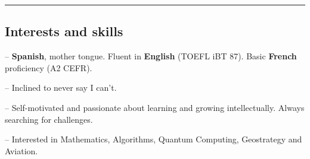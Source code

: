 \documentclass[10pt,letterpaper]{article}
\newenvironment{indentsection}[1]%
{\begin{list}{}%
	{\setlength{\leftmargin}{#1}}%
	\item[]%
}
{\end{list}}
\begin{document}
\hrule
\vspace{-0.4em}
\subsection*{Interests and skills}

\begin{indentsection}{\parindent}
\begin{description*}
	\item -- \textbf{Spanish}, mother tongue. Fluent in \textbf{English} (TOEFL iBT 87). Basic \textbf{French} proficiency (A2 CEFR).
	\item -- Inclined to never say I can't.
	\item -- Self-motivated and passionate about learning and growing intellectually. Always searching for challenges.
	\item -- Interested in Mathematics, Algorithms, Quantum Computing, Geostrategy and Aviation.
\end{description*}
\end{indentsection}
\end{document}
